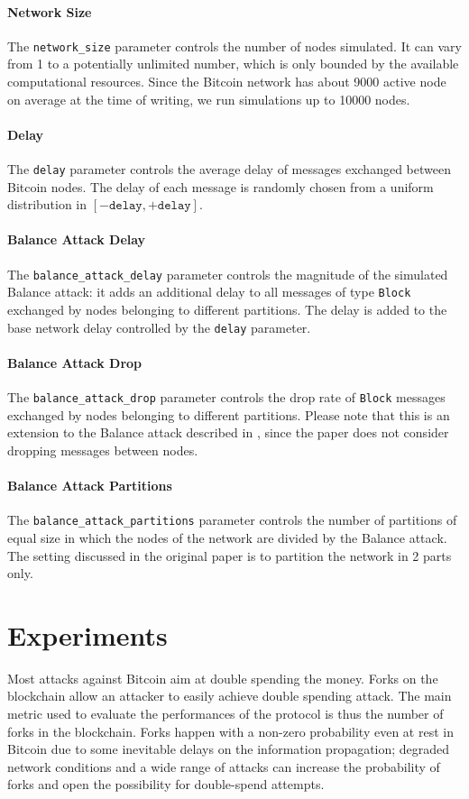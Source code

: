 \paragraph{Network Size}
The \texttt{network\_size} parameter controls the number of nodes simulated.
It can vary from \num{1} to a potentially unlimited number, which is only bounded by the available computational resources.
Since the Bitcoin network has about \num{9000} active node on average at the time of writing, we run simulations up to \num{10000} nodes.

\paragraph{Delay}
The \texttt{delay} parameter controls the average delay of messages exchanged between Bitcoin nodes.
The delay of each message is randomly chosen from a uniform distribution in $[-\texttt{delay}, +\texttt{delay}]$.

\paragraph{Balance Attack Delay}
The \texttt{balance\_attack\_delay} parameter controls the magnitude of the simulated Balance attack:
it adds an additional delay to all messages of type \texttt{Block} exchanged by nodes belonging to different partitions.
The delay is added to the base network delay controlled by the \texttt{delay} parameter.

\paragraph{Balance Attack Drop}
The \texttt{balance\_attack\_drop} parameter controls the drop rate of \texttt{Block} messages exchanged by nodes belonging to different partitions.
Please note that this is an extension to the Balance attack described in \cite{balance_attack_2017}, since the paper does not consider dropping messages between nodes.

\paragraph{Balance Attack Partitions}
The \texttt{balance\_attack\_partitions} parameter controls the number of partitions of equal size in which the nodes of the network are divided by the Balance attack.
The setting discussed in the original paper is to partition the network in \num{2} parts only.


\section{Experiments}
Most attacks against Bitcoin aim at double spending the money.
Forks on the blockchain allow an attacker to easily achieve double spending attack.
The main metric used to evaluate the performances of the protocol is thus the number of forks in the blockchain.
Forks happen with a non-zero probability even at rest in Bitcoin due to some inevitable delays on the information propagation;
degraded network conditions and a wide range of attacks can increase the probability of forks and open the possibility for double-spend attempts.

